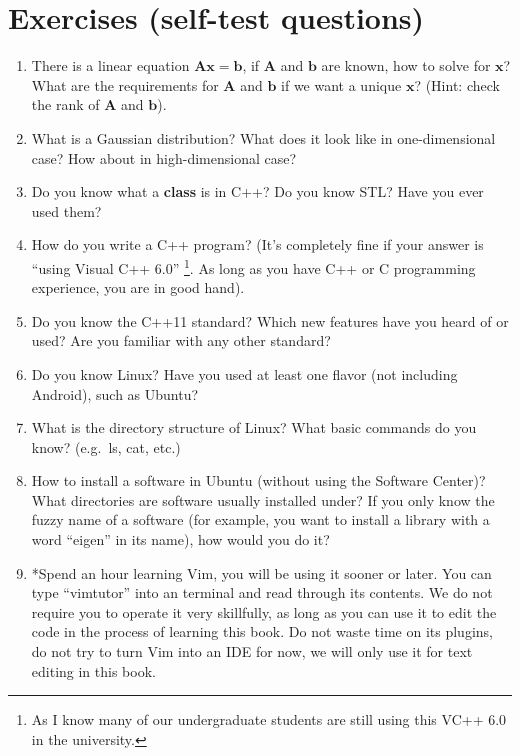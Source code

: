 \section{Exercises (self-test questions)}
\begin{enumerate}
	\item There is a linear equation $\mathbf{Ax}=\mathbf{b}$, if $\mathbf{A}$ and $\mathbf{b}$ are known, how to solve for $\mathbf{x}$? What are the requirements for $\mathbf{A}$ and $\mathbf{b}$ if we want a unique $\mathbf{x}$? (Hint: check the rank of $\mathbf{A}$ and $\mathbf{b}$).
	
	\item What is a Gaussian distribution? What does it look like in one-dimensional case? How about in high-dimensional case?
	
	\item Do you know what a \textbf{class} is in C++? Do you know STL? Have you ever used them?
	
	\item How do you write a C++ program? (It's completely fine if your answer is ``using Visual C++ 6.0'' \footnote{As I know many of our undergraduate students are still using this VC++ 6.0 in the university. }. As long as you have C++ or C programming experience, you are in good hand).
	
	\item Do you know the C++11 standard? Which new features have you heard of or used? Are you familiar with any other standard?
	
	\item Do you know Linux? Have you used at least one flavor (not including Android), such as Ubuntu?
	
	\item What is the directory structure of Linux? What basic commands do you know? (e.g.\ ls, cat, etc.)
	
	\item How to install a software in Ubuntu (without using the Software Center)? What directories are software usually installed under? If you only know the fuzzy name of a software (for example, you want to install a library with a word ``eigen'' in its name), how would you do it?
	
	\item *Spend an hour learning Vim, you will be using it sooner or later. You can type ``vimtutor'' into an terminal and read through its contents. We do not require you to operate it very skillfully, as long as you can use it to edit the code in the process of learning this book. Do not waste time on its plugins, do not try to turn Vim into an IDE for now, we will only use it for text editing in this book.
	
\end{enumerate}